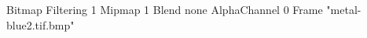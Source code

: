 {Bitmap
	{Filtering 1}
	{Mipmap 1}
	{Blend none}
	{AlphaChannel 0}
	{Frame "metal-blue2.tif.bmp"}
}

